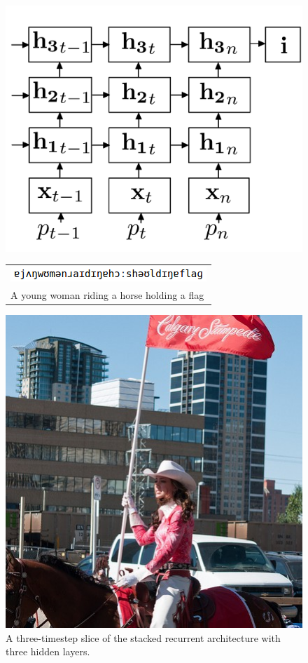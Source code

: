 \begin{figure}
\begin{minipage}[l]{0.45\textwidth}
  \includegraphics[scale=0.2]{architecture.pdf}
  \caption{A three-timestep slice of the stacked recurrent architecture with three hidden layers.}
  \label{fig:architecture}
\end{minipage}
\hspace{0.3cm}
\begin{minipage}[r]{0.45\textwidth}
  \begin{tabular}{|l|}\hline
    \includegraphics[scale=0.7]{woman-ipa.png} \\
    A young woman riding a horse holding a flag\\\hline
  \end{tabular}
  \begin{center}
    \includegraphics[scale=0.2]{rider.jpg}
  \end{center}


\end{minipage}
\end{figure}
